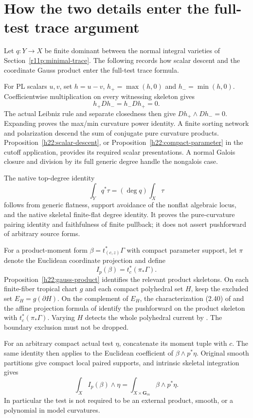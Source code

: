 \documentclass[11pt,a4paper]{article}
\theoremstyle{definition}
\theoremstyle{remark}
\begin{document}
\section{How the two details enter the full-test trace argument}

Let $q:Y\to X$ be finite dominant between the normal integral
varieties of Section~\ref{r11p:minimal-trace}. The following records
how scalar descent and the coordinate Gauss product enter the
full-test trace formula.

For PL scalars $u,v$, set $h=u-v$, $h_+=\max(h,0)$ and
$h_-=\min(h,0)$. Coefficientwise multiplication on every witnessing
skeleton gives
\[
 h_+Dh_-=h_-Dh_+=0.
\]
The actual Leibniz rule and separate closedness then give
$Dh_+\wedge Dh_-=0$. Expanding proves the max/min curvature power
identity. A finite sorting network and polarization descend the sum
of conjugate pure curvature products. Proposition~\ref{h22:scalar-descent},
or Proposition~\ref{h22:compact-parameter} in the cutoff application,
provides its required scalar presentations. A normal Galois closure
and division by its full generic degree handle the nongalois case.

The native top-degree identity
\[
                  \int_Yq^*\tau=(\deg q)\int_X\tau
\]
follows from generic flatness, support avoidance of the nonflat
algebraic locus, and the native skeletal finite-flat degree identity.
It proves the pure-curvature pairing identity and faithfulness of
finite pullback; it does not assert pushforward of arbitrary source
forms.

For a product-moment form $\beta=t_{(c,z)}^*\Gamma$ with compact
parameter support, let $\pi$ denote the Euclidean coordinate
projection and define
\[
                         I_p(\beta)=t_c^*(\pi_*\Gamma).
\]
Proposition~\ref{h22:gauss-product} identifies the relevant product
skeletons. On each finite-fiber tropical chart $g$ and each compact
polyhedral set $H$, keep the excluded set
$E_H=g(\partial H)$. On the complement of $E_H$, the characterization
(2.40) of \cite[Proposition~2.38]{MihLT} and the affine projection
formula of \cite{MihTrop} identify the pushforward on the product
skeleton with $t_c^*(\pi_*\Gamma)$. Varying $H$ detects the whole
polyhedral current by \cite[Lemma~2.37]{MihLT}. The boundary exclusion
must not be dropped.

For an arbitrary compact actual test $\eta$, concatenate its moment
tuple with $c$. The same identity then applies to the Euclidean
coefficient of $\beta\wedge p^*\eta$. Original smooth partitions
give compact local paired supports, and intrinsic skeletal integration
gives
\[
                   \int_X I_p(\beta)\wedge\eta
                    =\int_{X\times\mathbf G_m}\beta\wedge p^*\eta.
\]
In particular the test is not required to be an external product,
smooth, or a polynomial in model curvatures.
\end{document}
